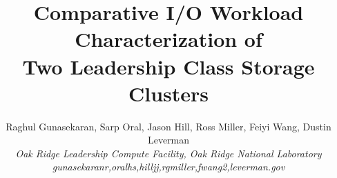 \documentclass[conference]{IEEEtran}
\begin{document}
\title{Comparative I/O Workload Characterization of\\
Two Leadership Class Storage Clusters}
%
%
%
%
%

%

\author{ 
Raghul Gunasekaran, Sarp Oral, Jason Hill, Ross Miller, Feiyi Wang, Dustin Leverman\\
\emph{Oak Ridge Leadership Compute Facility, Oak Ridge National Laboratory}\\
\emph{gunasekaranr,oralhs,hilljj,rgmiller,fwang2,leverman\@ornl.gov}
}


\maketitle



 
%
%


\nocite{reference}


\end{document}

